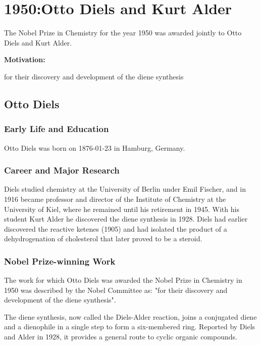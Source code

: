 \chapter{1950:Otto Diels and Kurt Alder}

\label{chap:chemistry1950}

The Nobel Prize in Chemistry for the year 1950 was awarded jointly to Otto Diels and Kurt Alder.

\textbf{Motivation:}

for their discovery and development of the diene synthesis

\section{Otto Diels}

\subsection*{Early Life and Education}

Otto Diels was born on 1876-01-23 in Hamburg, Germany.

\subsection*{Career and Major Research}

Diels studied chemistry at the University of Berlin under Emil Fischer, and in 1916 became professor and director of the Institute of Chemistry at the University of Kiel, where he remained until his retirement in 1945. With his student Kurt Alder he discovered the diene synthesis in 1928. Diels had earlier discovered the reactive ketenes (1905) and had isolated the product of a dehydrogenation of cholesterol that later proved to be a steroid.

\subsection*{Nobel Prize-winning Work}

The work for which Otto Diels was awarded the Nobel Prize in Chemistry in 1950 was described by the Nobel Committee as: "for their discovery and development of the diene synthesis".

The diene synthesis, now called the Diels-Alder reaction, joins a conjugated diene and a dienophile in a single step to form a six-membered ring. Reported by Diels and Alder in 1928, it provides a general route to cyclic organic compounds.

